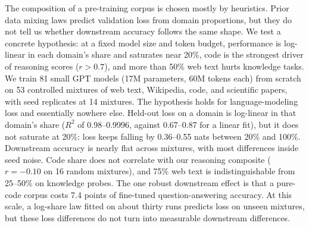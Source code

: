 The composition of a pre-training corpus is chosen mostly by heuristics.
Prior data mixing laws predict validation loss from domain proportions, but they do not tell us whether downstream accuracy follows the same shape.
We test a concrete hypothesis: at a fixed model size and token budget, performance is log-linear in each domain's share and saturates near 20\%, code is the strongest driver of reasoning scores ($r > 0.7$), and more than 50\% web text hurts knowledge tasks.
We train 81 small GPT models (17M parameters, 60M tokens each) from scratch on 53 controlled mixtures of web text, Wikipedia, code, and scientific papers, with seed replicates at 14 mixtures.
The hypothesis holds for language-modeling loss and essentially nowhere else.
Held-out loss on a domain is log-linear in that domain's share ($R^2$ of 0.98--0.9996, against 0.67--0.87 for a linear fit), but it does not saturate at 20\%: loss keeps falling by 0.36--0.55 nats between 20\% and 100\%.
Downstream accuracy is nearly flat across mixtures, with most differences inside seed noise.
Code share does not correlate with our reasoning composite ($r = -0.10$ on 16 random mixtures), and 75\% web text is indistinguishable from 25--50\% on knowledge probes.
The one robust downstream effect is that a pure-code corpus costs 7.4 points of fine-tuned question-answering accuracy.
At this scale, a log-share law fitted on about thirty runs predicts loss on unseen mixtures, but these loss differences do not turn into measurable downstream differences.
